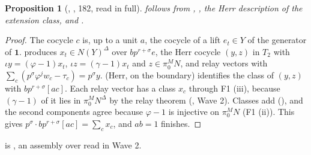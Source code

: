 \documentclass[11pt]{article}
\newcommand{\NN}{N^{\Delta}}
\newtheorem{prop}[lemma]{Proposition}
\theoremstyle{definition}
\theoremstyle{remark}
\begin{document}
\begin{prop}[, , 182, read in full]
 follows from , , the Herr description  of the extension class,  and .
\end{prop}
\begin{proof}
The cocycle $c$ is, up to a unit $a$, the cocycle of a lift $e_t\in Y$ of the generator of $\mathbf 1$.  produces $x_t\in N(Y)^\Delta$ over $bp^{r+\sigma}e$, the Herr cocycle $(y,z)$ in $T_2$ with $\iota y=(\varphi-1)x_t$, $\iota z=(\gamma-1)x_t$ and $z\in\pi_0^MN$, and relay vectors with $\sum_c(p^\sigma\varphi^jw_c-\tau_c)=p^\sigma y$.  (Herr, on the boundary) identifies the class of $(y,z)$ with $bp^{r+\sigma}[ac]$. Each relay vector has a class $x_c$ through F1 (iii), because $(\gamma-1)$ of it lies in $\pi_0^M\NN$ by the relay theorem (, Wave 2). Classes add (), and the second components agree because $\varphi-1$ is injective on $\pi_0^MN$ (F1 (ii)). This gives $p^{\sigma}\cdot bp^{r+\sigma}[ac]=\sum_cx_c$, and $ab=1$ finishes.
\end{proof}

 is , an assembly over  read in Wave 2.
\end{document}
